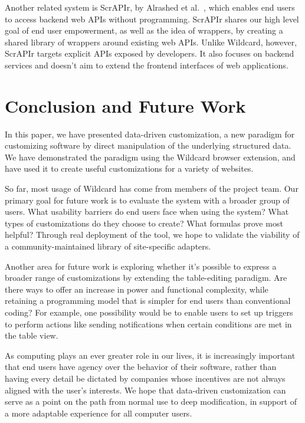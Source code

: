 \documentclass[sigplan,screen,10pt,anonymous,review]{acmart}
\begin{document}
Another related system is ScrAPIr, by Alrashed et
al.~\citep{alrashed2020}, which enables end users to access backend web
APIs without programming. ScrAPIr shares our high level goal of end user
empowerment, as well as the idea of wrappers, by creating a shared
library of wrappers around existing web APIs. Unlike Wildcard, however,
ScrAPIr targets explicit APIs exposed by developers. It also focuses on
backend services and doesn't aim to extend the frontend interfaces of
web applications.

\hypertarget{sec:conclusion}{%
\section{Conclusion and Future Work}\label{sec:conclusion}}

In this paper, we have presented data-driven customization, a new
paradigm for customizing software by direct manipulation of the
underlying structured data. We have demonstrated the paradigm using the
Wildcard browser extension, and have used it to create useful
customizations for a variety of websites.

So far, most usage of Wildcard has come from members of the project
team. Our primary goal for future work is to evaluate the system with a
broader group of users. What usability barriers do end users face when
using the system? What types of customizations do they choose to create?
What formulas prove most helpful? Through real deployment of the tool,
we hope to validate the viability of a community-maintained library of
site-specific adapters.

Another area for future work is exploring whether it's possible to
express a broader range of customizations by extending the table-editing
paradigm. Are there ways to offer an increase in power and functional
complexity, while retaining a programming model that is simpler for end
users than conventional coding? For example, one possibility would be to
enable users to set up triggers to perform actions like sending
notifications when certain conditions are met in the table view.

As computing plays an ever greater role in our lives, it is increasingly
important that end users have agency over the behavior of their
software, rather than having every detail be dictated by companies whose
incentives are not always aligned with the user's interests. We hope
that data-driven customization can serve as a point on the path from
normal use to deep modification, in support of a more adaptable
experience for all computer users.



\end{document}
